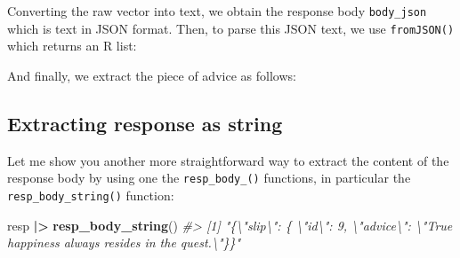 \documentclass[
]{book}
\newenvironment{Shaded}{\begin{snugshade}}{\end{snugshade}}
\newcommand{\CommentTok}[1]{\textcolor[rgb]{0.56,0.35,0.01}{\textit{#1}}}
\newcommand{\FunctionTok}[1]{\textcolor[rgb]{0.13,0.29,0.53}{\textbf{#1}}}
\newcommand{\NormalTok}[1]{#1}
\newcommand{\OtherTok}[1]{\textcolor[rgb]{0.56,0.35,0.01}{#1}}
\newcommand{\SpecialCharTok}[1]{\textcolor[rgb]{0.81,0.36,0.00}{\textbf{#1}}}
\begin{document}
Converting the raw vector into text, we obtain the response body \texttt{body\_json}
which is text in JSON format. Then, to parse this JSON text, we use \texttt{fromJSON()}
which returns an R list:

\begin{Shaded}
\end{Shaded}

And finally, we extract the piece of advice as follows:

\begin{Shaded}
\end{Shaded}

\hypertarget{extracting-response-as-string}{%
\subsection{Extracting response as string}\label{extracting-response-as-string}}

Let me show you another more straightforward way to extract the content of the
response body by using one the \texttt{resp\_body\_()} functions, in particular the
\texttt{resp\_body\_string()} function:

\begin{Shaded}
\begin{Highlighting}[]
\NormalTok{resp }\SpecialCharTok{|\textgreater{}} \FunctionTok{resp\_body\_string}\NormalTok{()}
\CommentTok{\#\textgreater{} [1] "\{\textbackslash{}"slip\textbackslash{}": \{ \textbackslash{}"id\textbackslash{}": 9, \textbackslash{}"advice\textbackslash{}": \textbackslash{}"True happiness always resides in the quest.\textbackslash{}"\}\}"}
\end{Highlighting}
\end{Shaded}
\end{document}
